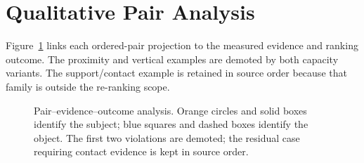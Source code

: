 \section{Qualitative Pair Analysis}

Figure~\ref{fig:supp-qualitative} links each ordered-pair projection to the
measured evidence and ranking outcome. The proximity and vertical examples are
demoted by both capacity variants. The support/contact example is retained in
source order because that family is outside the re-ranking scope.

\begin{figure}[t]
    \centering
    \caption{Pair--evidence--outcome analysis. Orange circles and solid boxes
    identify the subject; blue squares and dashed boxes identify the object.
    The first two violations are demoted; the residual case requiring contact
    evidence is kept in source order.}
    \label{fig:supp-qualitative}
\end{figure}
